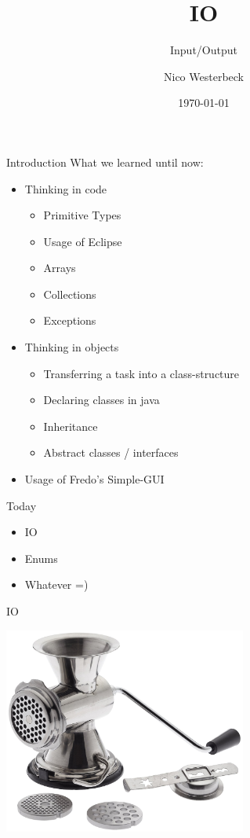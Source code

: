 
\usepackage{multicol}

\title{IO}
\subtitle{Input/Output}
\author{Nico Westerbeck}
\date{\today}




\titlepage

\begin{frame}{Introduction}
What we learned until now:
\begin{itemize}
	\item Thinking in code
	\begin{itemize}
		\item Primitive Types
		\item Usage of Eclipse
		\item Arrays
		\item Collections
		\item Exceptions
	\end{itemize}
	\item Thinking in objects
	\begin{itemize}
		\item Transferring a task into a class-structure
		\item Declaring classes in java
		\item Inheritance
		\item Abstract classes / interfaces
	\end{itemize}
	\item Usage of Fredo's Simple-GUI
\end{itemize}

\end{frame}

\begin{frame}{Today}
	\begin{itemize}
		\item IO
		\item Enums
		\item Whatever =)
	\end{itemize}
\end{frame}


\begin{frame}{IO}
	\begin{center}
		\includegraphics[width=8cm]{res/cookiepress.jpg}
	\end{center}
\end{frame}


